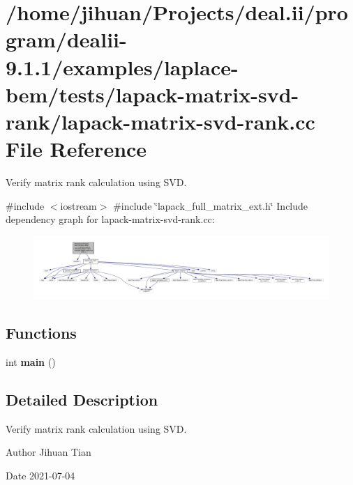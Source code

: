 \hypertarget{lapack-matrix-svd-rank_8cc}{}\section{/home/jihuan/\+Projects/deal.ii/program/dealii-\/9.1.1/examples/laplace-\/bem/tests/lapack-\/matrix-\/svd-\/rank/lapack-\/matrix-\/svd-\/rank.cc File Reference}
\label{lapack-matrix-svd-rank_8cc}


Verify matrix rank calculation using S\+VD.  


{\ttfamily \#include $<$iostream$>$}\newline
{\ttfamily \#include \char`\"{}lapack\+\_\+full\+\_\+matrix\+\_\+ext.\+h\char`\"{}}\newline
Include dependency graph for lapack-\/matrix-\/svd-\/rank.cc\+:
\nopagebreak
\begin{figure}[H]
\begin{center}
\leavevmode
\includegraphics[width=350pt]{lapack-matrix-svd-rank_8cc__incl}
\end{center}
\end{figure}
\subsection*{Functions}
\begin{DoxyCompactItemize}
\item 
\mbox{\label{lapack-matrix-svd-rank_8cc_ae66f6b31b5ad750f1fe042a706a4e3d4}} 
int {\bfseries main} ()
\end{DoxyCompactItemize}


\subsection{Detailed Description}
Verify matrix rank calculation using S\+VD. 

\begin{DoxyAuthor}{Author}
Jihuan Tian 
\end{DoxyAuthor}
\begin{DoxyDate}{Date}
2021-\/07-\/04 
\end{DoxyDate}
